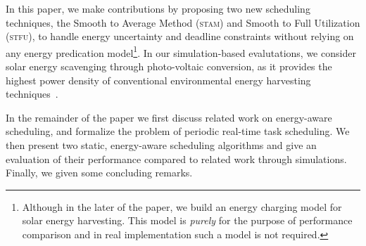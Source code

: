 In this paper, we make contributions by proposing two new scheduling techniques, the Smooth to Average Method (\textsc{stam}) and Smooth to Full Utilization (\textsc{stfu}), to handle energy uncertainty and deadline constraints without relying on any energy predication model\footnote{Although in the later of the paper, we build an energy charging model for solar energy harvesting. This model is \textit{purely} for the purpose of performance comparison and in real implementation such a model is not required.}.
In our simulation-based evalutations, we consider solar energy scavenging through photo-voltaic conversion, as it provides the highest power density of conventional environmental energy harvesting techniques~\cite{raghunathan2005design}. 

In the remainder of the paper we first discuss related work on energy-aware scheduling, 
and formalize the problem of periodic real-time task scheduling. 
We then present two static, energy-aware scheduling algorithms and give
an evaluation of their performance compared to related work through simulations. 
Finally, we given some concluding remarks. 

